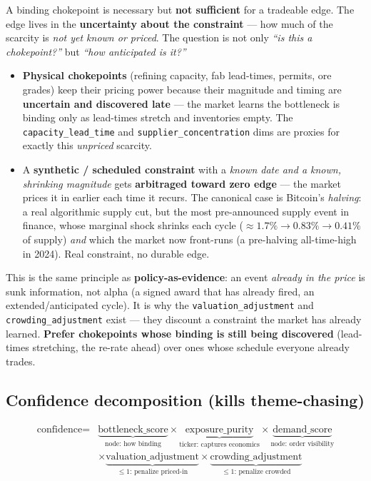 \documentclass[11pt]{article}
\begin{document}
A binding chokepoint is necessary but \textbf{not sufficient} for a tradeable edge. The edge lives
in the \textbf{uncertainty about the constraint} --- how much of the scarcity is \emph{not yet known
or priced}. The question is not only \emph{``is this a chokepoint?''} but \emph{``how anticipated
is it?''}

\begin{itemize}
  \item \textbf{Physical chokepoints} (refining capacity, fab lead-times, permits, ore grades) keep
    their pricing power because their magnitude and timing are \textbf{uncertain and discovered
    late} --- the market learns the bottleneck is binding only as lead-times stretch and inventories
    empty. The \texttt{capacity\_lead\_time} and \texttt{supplier\_concentration} dims are proxies
    for exactly this \emph{unpriced} scarcity.
  \item A \textbf{synthetic / scheduled constraint} with a \emph{known date and a known, shrinking
    magnitude} gets \textbf{arbitraged toward zero edge} --- the market prices it in earlier each
    time it recurs. The canonical case is Bitcoin's \emph{halving}: a real algorithmic supply cut,
    but the most pre-announced supply event in finance, whose marginal shock shrinks each cycle
    (${\approx}1.7\% \to 0.83\% \to 0.41\%$ of supply) \emph{and} which the market now front-runs
    (a pre-halving all-time-high in 2024). Real constraint, no durable edge.
\end{itemize}

This is the same principle as \textbf{policy-as-evidence}: an event \emph{already in the price} is
sunk information, not alpha (a signed award that has already fired, an extended/anticipated cycle).
It is why the \texttt{valuation\_adjustment} and \texttt{crowding\_adjustment} exist --- they
discount a constraint the market has already learned. \textbf{Prefer chokepoints whose binding is
still being discovered} (lead-times stretching, the re-rate ahead) over ones whose schedule
everyone already trades.

\subsection{Confidence decomposition (kills theme-chasing)}

\[
\begin{aligned}
\text{confidence} = {}&\underbrace{\text{bottleneck\_score}}_{\text{node: how binding}}
  \times \underbrace{\text{exposure\_purity}}_{\text{ticker: captures economics}}
  \times \underbrace{\text{demand\_score}}_{\text{node: order visibility}} \\
  &\times \underbrace{\text{valuation\_adjustment}}_{\le 1\text{: penalize priced-in}}
  \times \underbrace{\text{crowding\_adjustment}}_{\le 1\text{: penalize crowded}}
\end{aligned}
\]
\end{document}
